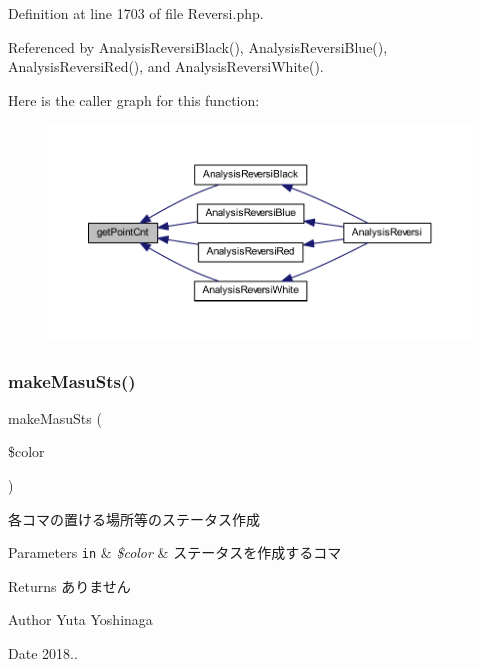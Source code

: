 Definition at line 1703 of file Reversi.\+php.



Referenced by Analysis\+Reversi\+Black(), Analysis\+Reversi\+Blue(), Analysis\+Reversi\+Red(), and Analysis\+Reversi\+White().

Here is the caller graph for this function\+:\nopagebreak
\begin{figure}[H]
\begin{center}
\leavevmode
\includegraphics[width=350pt]{class_reversi_af538d04718f177f71461f582f3bd8eba_icgraph}
\end{center}
\end{figure}
\mbox{\label{class_reversi_a88869682786bb7c45c3488113deaa789}} 
\subsubsection{\texorpdfstring{make\+Masu\+Sts()}{makeMasuSts()}}
{\footnotesize\ttfamily make\+Masu\+Sts (\begin{DoxyParamCaption}\item[{}]{\$color }\end{DoxyParamCaption})\hspace{0.3cm}{\ttfamily [private]}}



各コマの置ける場所等のステータス作成 


\begin{DoxyParams}[1]{Parameters}
\mbox{\tt in}  & {\em \$color} & ステータスを作成するコマ \\
\hline
\end{DoxyParams}
\begin{DoxyReturn}{Returns}
ありません 
\end{DoxyReturn}
\begin{DoxyAuthor}{Author}
Yuta Yoshinaga 
\end{DoxyAuthor}
\begin{DoxyDate}{Date}
2018.. 
\end{DoxyDate}


